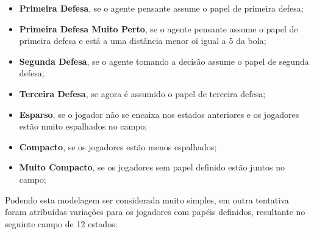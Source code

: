 \begin{itemize}
    \item \textbf{Primeira Defesa}, se o agente pensante assume o papel de
    primeira defesa;
    \item \textbf{Primeira Defesa Muito Perto}, se o agente pensante assume o papel de
    primeira defesa e está a uma distância menor oi igual a 5 da bola;
    \item  \textbf{Segunda Defesa}, se o agente tomando a decisão assume o papel
    de segunda defesa;
    \item \textbf{Terceira Defesa}, se agora é assumido o papel de terceira
    defesa;
    \item \textbf{Esparso}, se o jogador não se encaixa nos estados anteriores e
    os jogadores estão muito espalhados no campo;
    \item \textbf{Compacto}, se os jogadores estão menos espalhados;
    \item \textbf{Muito Compacto}, se os jogadores sem papel definido estão
    juntos no campo;
\end{itemize}

Podendo esta modelagem ser considerada muito simples, em outra tentativa foram
atribuídas variações para os jogadores com papéis definidos, resultante no
seguinte campo de 12 estados:

